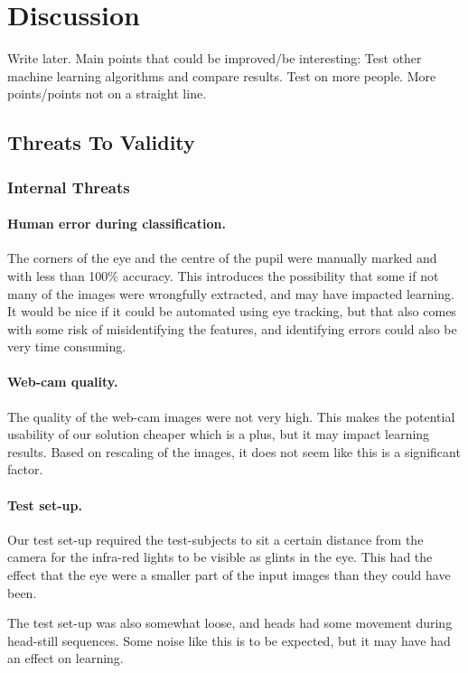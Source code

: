 \section{Discussion}
Write later. Main points that could be improved/be interesting:
Test other machine learning algorithms and compare results.
Test on more people.
More points/points not on a straight line.

\subsection{Threats To Validity}
\subsubsection{Internal Threats}
\paragraph{Human error during classification.}
The corners of the eye and the centre of the pupil were manually marked and with less than 100\% accuracy.
This introduces the possibility that some if not many of the images were wrongfully extracted, and may have impacted learning.
It would be nice if it could be automated using eye tracking, but that also comes with some risk of misidentifying the features, and identifying errors could also be very time consuming.

\paragraph{Web-cam quality.}
The quality of the web-cam images were not very high.
This makes the potential usability of our solution cheaper which is a plus, but it may impact learning results.
Based on rescaling of the images, it does not seem like this is a significant factor.

\paragraph{Test set-up.}
Our test set-up required the test-subjects to sit a certain distance from the camera for the infra-red lights to be visible as glints in the eye.
This had the effect that the eye were a smaller part of the input images than they could have been.

The test set-up was also somewhat loose, and heads had some movement during head-still sequences.
Some noise like this is to be expected, but it may have had an effect on learning.

